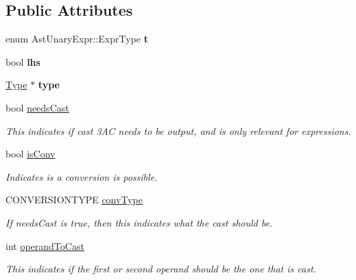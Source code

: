 \subsection*{Public Attributes}
\begin{DoxyCompactItemize}
\item 
\hypertarget{classAstUnaryExpr_a4ca750c972fcd2bec69b7cc81e2bd0de}{enum Ast\-Unary\-Expr\-::\-Expr\-Type {\bfseries t}}\label{classAstUnaryExpr_a4ca750c972fcd2bec69b7cc81e2bd0de}

\item 
\hypertarget{classAstUnaryExpr_afae21333811a060d5436d2954194d13b}{bool {\bfseries lhs}}\label{classAstUnaryExpr_afae21333811a060d5436d2954194d13b}

\item 
\hypertarget{classAstUnaryExpr_aa9c89ebae5cc9ad9a830c3511d38018f}{\hyperlink{classType}{Type} $\ast$ {\bfseries type}}\label{classAstUnaryExpr_aa9c89ebae5cc9ad9a830c3511d38018f}

\item 
\hypertarget{classAST_aaf215802de409f8096c063d01ffa6783}{bool \hyperlink{classAST_aaf215802de409f8096c063d01ffa6783}{needs\-Cast}}\label{classAST_aaf215802de409f8096c063d01ffa6783}

\begin{DoxyCompactList}\small\item\em This indicates if cast 3\-A\-C needs to be output, and is only relevant for expressions. \end{DoxyCompactList}\item 
\hypertarget{classAST_afa9e77ef650ec6664458fa6cb55be985}{bool \hyperlink{classAST_afa9e77ef650ec6664458fa6cb55be985}{is\-Conv}}\label{classAST_afa9e77ef650ec6664458fa6cb55be985}

\begin{DoxyCompactList}\small\item\em Indicates is a conversion is possible. \end{DoxyCompactList}\item 
\hypertarget{classAST_a61ef3317e023d45237e06615b387cd6b}{C\-O\-N\-V\-E\-R\-S\-I\-O\-N\-T\-Y\-P\-E \hyperlink{classAST_a61ef3317e023d45237e06615b387cd6b}{conv\-Type}}\label{classAST_a61ef3317e023d45237e06615b387cd6b}

\begin{DoxyCompactList}\small\item\em If needs\-Cast is true, then this indicates what the cast should be. \end{DoxyCompactList}\item 
\hypertarget{classAST_aea9b07b39d24183f38c0029cec0a878e}{int \hyperlink{classAST_aea9b07b39d24183f38c0029cec0a878e}{operand\-To\-Cast}}\label{classAST_aea9b07b39d24183f38c0029cec0a878e}

\begin{DoxyCompactList}\small\item\em This indicates if the first or second operand should be the one that is cast. \end{DoxyCompactList}\end{DoxyCompactItemize}
